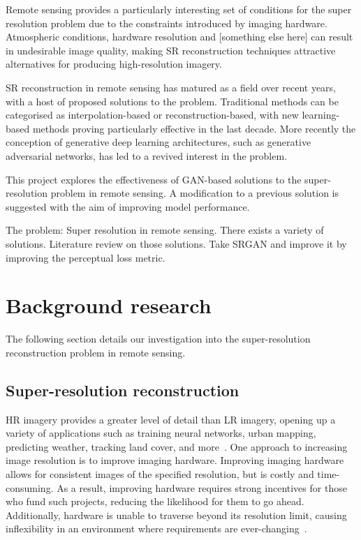 Remote sensing provides a particularly interesting set of conditions for the super resolution problem due to the constraints introduced by imaging hardware. Atmospheric conditions, hardware resolution and [something else here] can result in undesirable image quality, making SR reconstruction techniques attractive alternatives for producing high-resolution imagery.

SR reconstruction in remote sensing has matured as a field over recent years, with a host of proposed solutions to the problem. Traditional methods can be categorised as interpolation-based or reconstruction-based, with new learning-based methods proving particularly effective in the last decade. More recently the conception of generative deep learning architectures, such as generative adversarial networks, has led to a revived interest in the problem.

This project explores the effectiveness of GAN-based solutions to the super-resolution problem in remote sensing. A modification to a previous solution is suggested with the aim of improving model performance.

The problem: Super resolution in remote sensing. There exists a variety of solutions. Literature review on those solutions. Take SRGAN and improve it by improving the perceptual loss metric.

\section{Background research}\label{sec:background_research}
The following section details our investigation into the super-resolution reconstruction problem in remote sensing.

\subsection{Super-resolution reconstruction}
HR imagery provides a greater level of detail than LR imagery, opening up a variety of applications such as training neural networks, urban mapping, predicting weather, tracking land cover, and more~\cite{hrTrainNN, urbanMapping, mapping, cloudCover, vegetationMapping}. One approach to increasing image resolution is to improve imaging hardware. Improving imaging hardware allows for consistent images of the specified resolution, but is costly and time-consuming. As a result, improving hardware requires strong incentives for those who fund such projects, reducing the likelihood for them to go ahead. Additionally, hardware is unable to traverse beyond its resolution limit, causing inflexibility in an environment where requirements are ever-changing~\cite{remoteSensingGANsReview}. 

